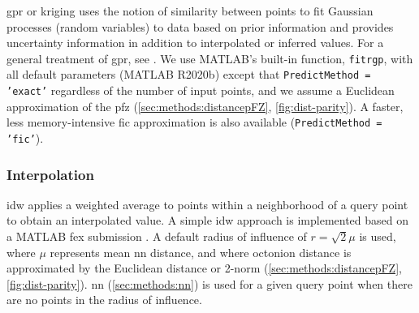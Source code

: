 \documentclass[preprint,12pt]{elsarticle}
\begin{document}
\subsubsection{}


\Gls{gpr} or kriging uses the notion of similarity between points to fit Gaussian processes (random variables) to data based on prior information and provides uncertainty information in addition to interpolated or inferred values. For a general treatment of \gls{gpr}, see \cite{rasmussenGaussianProcessesMachine2006}. We use MATLAB's built-in function, \texttt{fitrgp}, with all default parameters (MATLAB R2020b) except that \texttt{PredictMethod = 'exact'} regardless of the number of input points, and we assume a Euclidean approximation of the \gls{pfz} (\cref{sec:methods:distancepFZ}, \cref{fig:dist-parity}). A faster, less memory-intensive \gls{fic} approximation is also available (\texttt{PredictMethod = 'fic'}).

\subsubsection{ Interpolation}


\Gls{idw} applies a weighted average to points within a neighborhood of a query point to obtain an interpolated value. A simple \gls{idw} approach is implemented based on a MATLAB \gls{fex} submission \cite{tovarInverseDistanceWeight2020}. A default radius of influence of $r=\sqrt{2} \mu$ is used, where $\mu$ represents mean \gls{nn} distance, and where octonion distance is approximated by the Euclidean distance or 2-norm (\cref{sec:methods:distancepFZ}, \cref{fig:dist-parity}). \gls{nn} (\cref{sec:methods:nn}) is used for a given query point when there are no points in the radius of influence.
\end{document}
